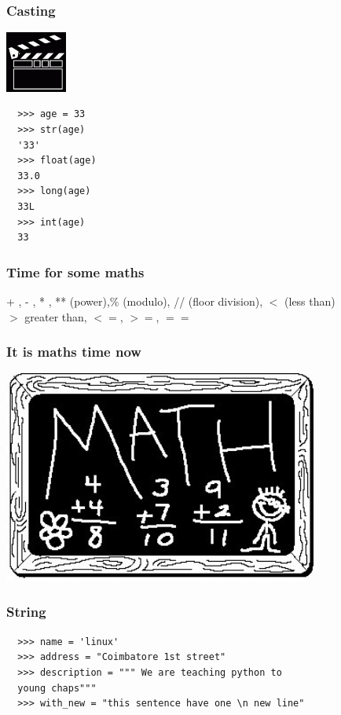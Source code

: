 \documentclass{beamer}
\begin{document}
\begin{frame}[fragile]
 \frametitle{Casting}
 \begin{center}
   \includegraphics[height=2cm]{cast.png}
 \begin{verbatim}
  >>> age = 33
  >>> str(age)
  '33'
  >>> float(age)
  33.0
  >>> long(age)
  33L
  >>> int(age)
  33
 \end{verbatim}
 \end{center}
\end{frame}

\begin{frame}
 \frametitle{Time for some maths}
 \begin{block}{}
  + , - , * , ** (power),\% (modulo), // (floor division), $<$ (less than) \\
  $>$ greater than, $<=$, $>=$, $==$ 
 \end{block}

\end{frame}

\begin{frame}
 \frametitle{It is maths time now}
 \begin{center}
  \includegraphics[height=7cm]{math.jpg}
 \end{center}

\end{frame}

\begin{frame}[fragile]
 \frametitle{String}
 \begin{verbatim}
  >>> name = 'linux'
  >>> address = "Coimbatore 1st street"
  >>> description = """ We are teaching python to 
  young chaps"""
  >>> with_new = "this sentence have one \n new line"
 \end{verbatim}

\end{frame}
\end{document}
